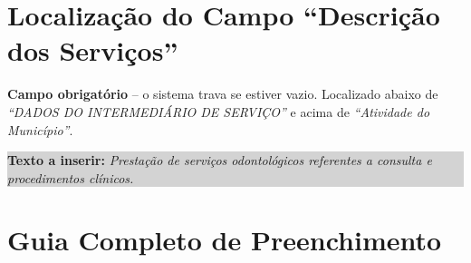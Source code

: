 \documentclass[10pt, a4paper]{article}
\begin{document}
\section{Localização do Campo ``Descrição dos Serviços''}

\colorbox{warningOrange!15}{%
    \parbox{\dimexpr\textwidth-2\fboxsep}{%
        \small\textbf{\textcolor{accentColor}{Campo obrigatório}} -- o sistema trava se estiver vazio.
        Localizado abaixo de \textit{``DADOS DO INTERMEDIÁRIO DE SERVIÇO''} e acima de \textit{``Atividade do Município''}.
    }%
}

\vspace{3pt}
\colorbox{lightGray}{%
    \parbox{\dimexpr\textwidth-2\fboxsep}{%
        \small\textbf{Texto a inserir:} \textit{Prestação de serviços odontológicos referentes a consulta e procedimentos clínicos.}
    }%
}

\section{Guia Completo de Preenchimento}
\end{document}

